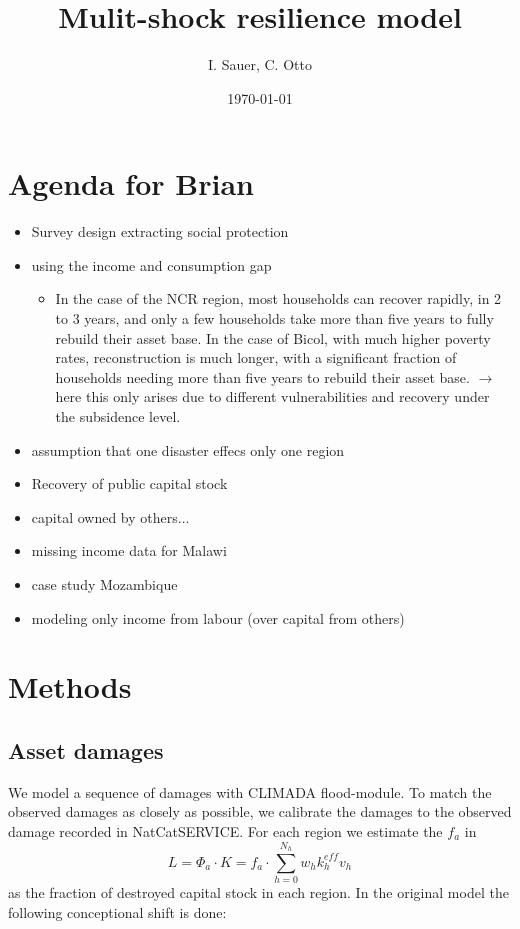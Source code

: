 \documentclass{article}
\author{I. Sauer, C. Otto}
\title{Mulit-shock resilience model}
\date{\today}
\begin{document}
\maketitle
\section{Agenda for Brian}
\begin{itemize}
	\item Survey design extracting social protection
	\item using the income and consumption gap
	\begin{itemize}
	\item In the case of the NCR region, most households can recover rapidly, in 2 to 3 years, and only a few households take more than five years to fully rebuild their asset base. In the
	case of Bicol, with much higher poverty rates, reconstruction is much longer, with a
	significant fraction of households needing more than five years to rebuild their asset
	base. $\rightarrow$ here this only arises due to different vulnerabilities and recovery under the subsidence level.
	\end{itemize}
	\item assumption that one disaster effecs only one region
	\item Recovery of public capital stock
	\item capital owned by others...
	\item missing income data for Malawi
	\item case study Mozambique
	\item modeling only income from labour (over capital from others)
	
\end{itemize}
\section{Methods}
\subsection{Asset damages}
We model a sequence of damages with CLIMADA flood-module. To match the observed damages as closely as possible, we calibrate the damages to the observed damage recorded in NatCatSERVICE. For each region we estimate the $f_a$ in 
\begin{equation}
L = \Phi_a \cdot K = f_a \cdot \sum\limits_{h=0}^{N_h} w_h k_h^{eff} v_h
\end{equation}
as the fraction of destroyed capital stock in each region. In the original model the following conceptional shift is done:
\end{document}

